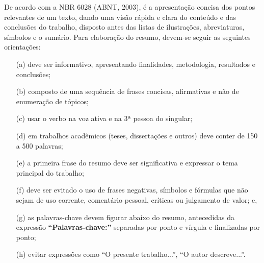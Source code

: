 De acordo com a NBR 6028 (ABNT, 2003), é a apresentação concisa dos pontos
relevantes de um texto, dando uma visão rápida e clara do conteúdo e das conclusões do trabalho, disposto antes das listas de ilustrações, abreviaturas, símbolos e o sumário. Para elaboração do resumo, devem-se seguir as seguintes orientações:

\begin{itemize}
	\item[(a)] deve ser informativo, apresentando finalidades, metodologia, resultados e conclusões;
	
	\item[(b)] composto de uma sequência de frases concisas, afirmativas e não de enumeração de tópicos;
	
	\item[(c)] usar o verbo na voz ativa e na 3ª pessoa do singular;
	
	\item[(d)] em trabalhos acadêmicos (teses, dissertações e outros) deve conter de 150 a 500 palavras;
	
	\item[(e)] a primeira frase do resumo deve ser significativa e expressar o tema principal do trabalho;
	
	\item[(f)] deve ser evitado o uso de frases negativas, símbolos e fórmulas que não sejam de uso corrente, comentário pessoal, críticas ou julgamento de valor; e,
	
	\item[(g)] as palavras-chave devem figurar abaixo do resumo, antecedidas da expressão \textbf{``Palavras-chave:''} separadas por ponto e vírgula e finalizadas por ponto;
	
	\item[(h)] evitar expressões como ``O presente trabalho...'', ``O autor descreve...''.
\end{itemize}

